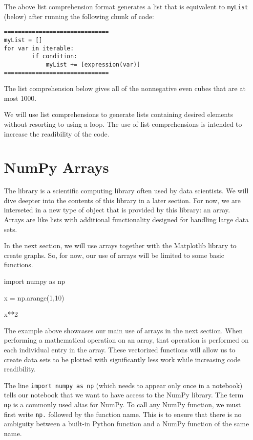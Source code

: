 \documentclass{ximera}
\begin{document}
The above list comprehension format generates a list that is equivalent to \verb|myList| (below) after running the following chunk of code:

\begin{verbatim}
==============================
myList = []
for var in iterable:
        if condition:
        	myList += [expression(var)]
==============================
\end{verbatim}

The list comprehension below gives all of the nonnegative even cubes that are at most 1000.


We will use list comprehensions to generate lists containing desired elements without resorting to using a loop. The use of list comprehensions is intended to increase the readibility of the code.

\section{NumPy Arrays}

The  library is a scientific computing library often used by data scientists. We will dive deepter into the contents of this library in a later section. For now, we are interseted in a new type of object that is provided by this library: an array. Arrays are like lists with additional functionality designed for handling large data sets. 

In the next section, we will use arrays together with the Matplotlib library to create graphs. So, for now, our use of arrays will be limited to some basic functions.

\begin{sageCell}
import numpy as np

x = np.arange(1,10)

x**2
\end{sageCell}

The example above showcases our main use of arrays in the next section. When performing a mathematical operation on an array, that operation is performed on each individual entry in the array. These vectorized functions will allow us to create data sets to be plotted with significantly less work while increasing code readibility.

The line \verb|import numpy as np| (which needs to appear only once in a notebook) tells our notebook that we want to have access to the NumPy library. The term \verb|np| is a commonly used alias for NumPy. To call any NumPy function, we must first write \verb|np.| followed by the function name. This is to ensure that there is no ambiguity between a built-in Python function and a NumPy function of the same name.
\end{document}
